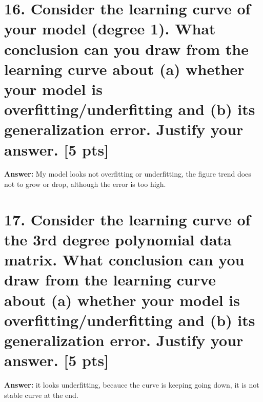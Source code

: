 \documentclass{article}
\begin{document}
\section*{16. Consider the learning curve of your model (degree 1). What conclusion can you draw from the learning curve about (a) whether your model is overfitting/underfitting and (b) its generalization error. Justify your answer. [5 pts]}
\textbf{Answer: } My model looks not overfitting or underfitting, the figure trend does not to grow or drop, although the error is too high.


\section*{17. Consider the learning curve of the 3rd degree polynomial data matrix. What conclusion can 	you draw from the learning curve about (a) whether your model is overfitting/underfitting and (b) its generalization error. Justify your answer. [5 pts]}
\textbf{Answer: } it looks underfitting, becauce the curve is keeping going down, it is not stable curve at the end.
\end{document}
